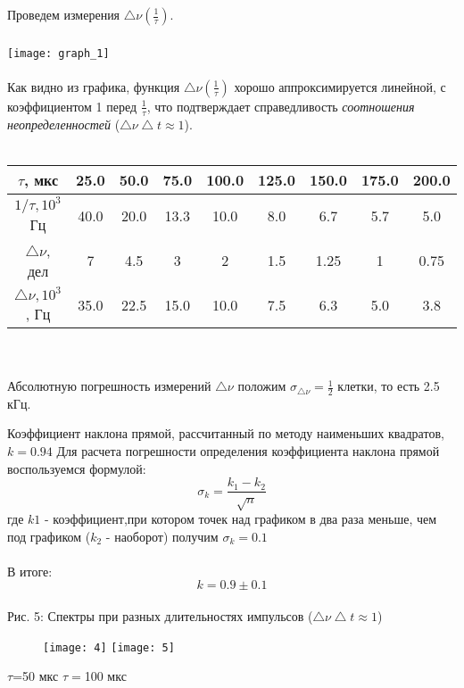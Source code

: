 \documentclass[a4paper,12pt]{article}
\begin{document}
Проведем измерения $\bigtriangleup\nu(\frac{1}{\tau})$.
\ \\
\ \\
\texttt{[image: graph\_1]}
\ \\
\ \\
Как видно из графика, функция $\bigtriangleup\nu(\frac{1}{\tau})$ хорошо аппроксимируется линейной, с коэффициентом 1 перед $\frac{1}{\tau}$, что подтверждает справедливость {{\it соотношения неопределенностей}} ($\bigtriangleup\nu\bigtriangleup t\approx1$).
\ \\
\ \\
\begin{tabular}{|c|c|c|c|c|c|c|c|c|}
	\hline
	$\tau$, мкс & 25.0 & 50.0 & 75.0 & 100.0 & 125.0 & 150.0 & 175.0 & 200.0 \\
	\hline
	$1/ \tau, 10^3$ Гц & 40.0 & 20.0 & 13.3 & 10.0 & 8.0 & 6.7 & 5.7 & 5.0\\
	\hline
	$\bigtriangleup\nu$, дел & 7 & 4.5 & 3 & 2 & 1.5 & 1.25 & 1 & 0.75 \\
	\hline
	$\bigtriangleup\nu, 10^3$, Гц & 35.0 & 22.5 & 15.0 & 10.0 & 7.5 & 6.3 & 5.0 & 3.8 \\
	\hline

\end{tabular}
\ \\
\ \\
Абсолютную погрешность измерений $\bigtriangleup\nu$ положим $\sigma_{\bigtriangleup\nu} = \frac{1}{2}$ клетки, то есть 2.5 кГц.
\newpage

Коэффициент наклона прямой, рассчитанный по методу наименьших квадратов, $k=0.94$
Для расчета погрешности определения коэффициента наклона прямой воспользуемся формулой:
$$ \sigma_k = \frac{k_1 - k_2}{\sqrt{n}}  $$ 
где $k1$ - коэффициент,при котором точек над графиком в два раза меньше, чем под графиком ($k_2$ - наоборот) получим $\sigma_{k}=0.1$
\ \\
\ \\
В итоге:
$$ k=0.9\pm0.1  $$ 
\ \\
Рис. 5: Спектры при разных длительностях импульсов ($\bigtriangleup\nu\bigtriangleup t\approx1$)
\begin{figure}[ht]
\texttt{[image: 4]}
\texttt{[image: 5]}
\end{figure}

\par \hspace{2.8cm} $\tau$=50 мкс
\hspace{6.6cm} $\tau=$100 мкс
\end{document}
